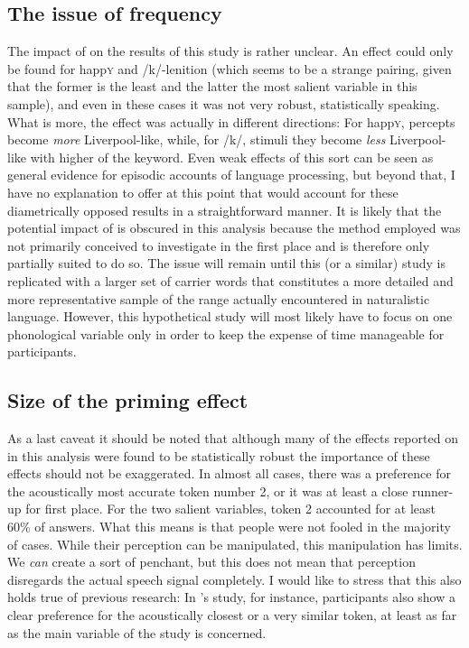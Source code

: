		\subsection{The issue of frequency}

The impact of  on the results of this study is rather unclear.
An effect could only be found for happ\textsc{y} and /k/-lenition (which seems to be a strange pairing, given that the former is the least and the latter the most salient variable in this sample), and even in these cases it was not very robust, statistically speaking.
What is more, the effect was actually in different directions: For happ\textsc{y}, percepts become \emph{more} Liverpool-like, while, for /k/, stimuli they become \emph{less} Liverpool-like with higher  of the keyword.
Even weak  effects of this sort can be seen as general evidence for episodic accounts of language processing, but beyond that, I have no explanation to offer at this point that would account for these diametrically opposed results in a straightforward manner.
It is likely that the potential impact of  is obscured in this analysis because the method employed was not primarily conceived to investigate  in the first place and is therefore only partially suited to do so.
The issue will remain until this (or a similar) study is replicated with a larger set of carrier words that constitutes a more detailed and more representative sample of the  range actually encountered in naturalistic language.
However, this hypothetical study will most likely have to focus on one phonological variable only in order to keep the expense of time manageable for participants.

		\subsection{Size of the priming effect}

As a last caveat it should be noted that although many of the  effects reported on in this analysis were found to be statistically robust the importance of these effects should not be exaggerated.
In almost all cases, there was a preference for the acoustically most accurate token number 2, or it was at least a close runner-up for first place.
For the two salient variables, token 2 accounted for at least 60\% of answers.
What this means is that people were not fooled in the majority of cases.
While their perception can be manipulated, this manipulation has limits.
We \emph{can} create a sort of penchant, but this does not mean that perception disregards the actual speech signal completely.
I would like to stress that this also holds true of previous research: In \textcite{haydrager2010}'s study, for instance, participants also show a clear preference for the acoustically closest or a very similar token, at least as far as the main variable of the study is concerned.

